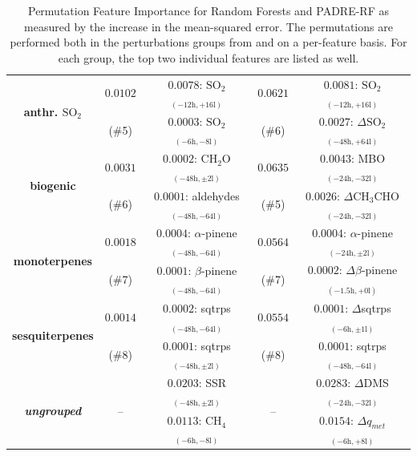 \begin{table}[H]
\begin{tabular}{ccccc}
        \multicolumn{1}{c}{\multirow{2}{*}{\textbf{anthr. $\text{SO}_{2}$}}} & \multicolumn{1}{c}{$0.0102$} & $0.0078$: $\text{SO}_{2}$ $_{(-12\text{h},+16\text{l})}$ & \multicolumn{1}{c}{$0.0621$} & $0.0081$: $\text{SO}_{2}$ $_{(-12\text{h},+16\text{l})}$ \\
        \multicolumn{1}{c}{} & \multicolumn{1}{c}{(\#5)} & $0.0003$: $\text{SO}_{2}$ $_{(-6\text{h},-8\text{l})}$ & \multicolumn{1}{c}{(\#6)} & $0.0027$: $\Delta \text{SO}_{2}$ $_{(-48\text{h},+64\text{l})}$ \\
        \multicolumn{1}{c}{\multirow{2}{*}{\textbf{biogenic}}} & \multicolumn{1}{c}{$0.0031$} & $0.0002$: $\text{CH}_2\text{O}$ $_{(-48\text{h},\pm 2\text{l})}$ & \multicolumn{1}{c}{$0.0635$} & $0.0043$: MBO $_{(-24\text{h},-32\text{l})}$ \\
        \multicolumn{1}{c}{} & \multicolumn{1}{c}{(\#6)} & $0.0001$: aldehydes $_{(-48\text{h},-64\text{l})}$ & \multicolumn{1}{c}{(\#5)} & $0.0026$: $\Delta\text{CH}_{3}\text{CHO}$ $_{(-24\text{h},-32\text{l})}$ \\
        \multicolumn{1}{c}{\multirow{2}{*}{\textbf{monoterpenes}}} & \multicolumn{1}{c}{$0.0018$} & $0.0004$: $\alpha$-pinene $_{(-48\text{h},-64\text{l})}$ & \multicolumn{1}{c}{$0.0564$} & $0.0004$: $\alpha$-pinene $_{(-24\text{h},\pm 2\text{l})}$ \\
        \multicolumn{1}{c}{} & \multicolumn{1}{c}{(\#7)} & $0.0001$: $\beta$-pinene $_{(-48\text{h},-64\text{l})}$ & \multicolumn{1}{c}{(\#7)} & $0.0002$: $\Delta \beta$-pinene $_{(-1.5\text{h},+0\text{l})}$ \\
        \multicolumn{1}{c}{\multirow{2}{*}{\textbf{sesquiterpenes}}} & \multicolumn{1}{c}{$0.0014$} & $0.0002$: sqtrps $_{(-48\text{h},-64\text{l})}$ & \multicolumn{1}{c}{$0.0554$} & $0.0001$: $\Delta$sqtrps $_{(-6\text{h},\pm 1\text{l})}$ \\
        \multicolumn{1}{c}{} & \multicolumn{1}{c}{(\#8)} & $0.0001$: sqtrps $_{(-48\text{h},\pm 2\text{l})}$ & \multicolumn{1}{c}{(\#8)} & $0.0001$: sqtrps $_{(-48\text{h},-64\text{l})}$ \\
        \multicolumn{1}{c}{\multirow{2}{*}{\textit{\textbf{ungrouped}}}} & \multicolumn{1}{c}{\multirow{2}{*}{--}} & $0.0203$: SSR $_{(-48\text{h},\pm 2\text{l})}$ & \multicolumn{1}{c}{\multirow{2}{*}{--}} & $0.0283$: $\Delta$DMS $_{(-24\text{h},-32\text{l})}$ \\
        \multicolumn{1}{c}{} & \multicolumn{1}{c}{} & $0.0113$: $\text{CH}_4$ $_{(-6\text{h},-8\text{l})}$ & \multicolumn{1}{c}{} & $0.0154$: $\Delta q_{met}$ $_{(-6\text{h},+8\text{l})}$ \\ \bottomrule
    \end{tabular}
    \caption[Permutation Feature Importance for Random Forests and PADRE-RF]{Permutation Feature Importance for Random Forests and PADRE-RF as measured by the increase in the mean-squared error. The permutations are performed both in the perturbations groups from  and on a per-feature basis. For each group, the top two individual features are listed as well.}
    \label{tab:permutation-feature-importance}
\end{table}

